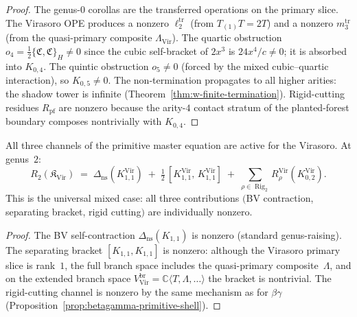 \begin{proof}
The genus-$0$ corollas are the transferred operations on the
primary slice.  The Virasoro OPE produces a nonzero $\ell_2^{\mathrm{tr}}$
(from $T_{(1)}T = 2T$) and a nonzero $m_3^{\mathrm{tr}}$
(from the quasi-primary composite $\Lambda_{\mathrm{Vir}}$).
The quartic obstruction $o_4 = \frac{1}{2}\{\mathfrak{C}, \mathfrak{C}\}_H
\neq 0$ since the cubic self-bracket of $2x^3$ is
$24x^4/c \neq 0$; it is absorbed into $K_{0,4}$.  The quintic
obstruction $o_5 \neq 0$ (forced by the mixed cubic--quartic
interaction), so $K_{0,5} \neq 0$.  The non-termination propagates
to all higher arities: the shadow tower is infinite
(Theorem~\ref{thm:w-finite-termination}).  Rigid-cutting residues
$R_{\mathrm{pf}}$ are nonzero because the arity-$4$ contact stratum
of the planted-forest boundary composes nontrivially with
$K_{0,4}$.
\end{proof}

\begin{proposition}
\label{prop:virasoro-primitive-shell}
All three channels of the primitive master equation are active for
the Virasoro.  At genus~$2$:
\begin{equation}\label{eq:virasoro-shell-genus2}
R_2(\mathfrak{K}_{\mathrm{Vir}})
\;=\;
\Delta_{\mathrm{ns}}(K_{1,1}^{\mathrm{Vir}})
\;+\;
\tfrac{1}{2}\,[K_{1,1}^{\mathrm{Vir}},\,K_{1,1}^{\mathrm{Vir}}]
\;+\;
\sum_{\rho \in \operatorname{Rig}_2}
R_\rho^{\mathrm{Vir}}(K_{0,2}^{\mathrm{Vir}}).
\end{equation}
This is the universal mixed case: all three contributions
$($BV contraction, separating bracket, rigid cutting$)$ are
individually nonzero.
\end{proposition}

\begin{proof}
The BV self-contraction $\Delta_{\mathrm{ns}}(K_{1,1})$ is nonzero
(standard genus-raising).  The separating bracket
$[K_{1,1}, K_{1,1}]$ is nonzero: although the Virasoro primary
slice is rank~$1$, the full branch space includes the
quasi-primary composite~$\Lambda$, and on the extended
branch space $V_{\mathrm{Vir}}^{\mathrm{br}}
= \mathbb{C}\langle T, \Lambda, \ldots\rangle$ the bracket
is nontrivial.  The rigid-cutting channel is nonzero by the
same mechanism as for $\beta\gamma$
(Proposition~\ref{prop:betagamma-primitive-shell}).
\end{proof}

